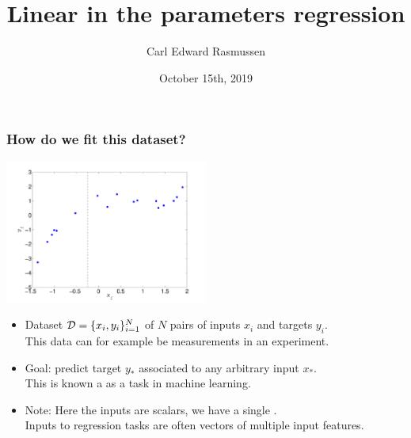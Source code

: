 

\title{Linear in the parameters regression}
\author{Carl Edward Rasmussen}
\date{October 15th, 2019}



\begin{frame}
\titlepage
\end{frame}

\begin{frame}
\frametitle{How do we fit this dataset?}

\centerline{\includegraphics[width=0.5\textwidth]{toy_data.pdf}}

\vfill

\begin{itemize}
\item Dataset ${\cal D}=\{x_i,y_i\}_{i=1}^N$ of $N$ pairs of inputs 
$x_i$ and  targets $y_i$.\\ This data can for example be
measurements in an experiment.
\item Goal: predict target $y_*$ associated to any arbitrary input 
$x_*$.\\ This is known a as a  task in machine learning.
\item Note: Here the inputs are scalars, we have a single .\\ 
Inputs to regression tasks are often vectors of multiple input features.
\end{itemize}
\end{frame}

